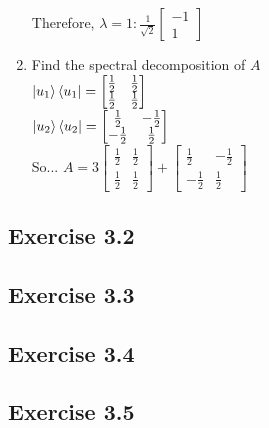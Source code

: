 \documentclass[12pt]{article}
\theoremstyle{plain}
\theoremstyle{nonumberplain}
\theoremstyle{plain}
\theoremstyle{nonumberplain}
\newcommand\1{{\bf 1}}
\newcommand{\bmat}[1]{\begin{bmatrix*} #1 \end{bmatrix*}} %
\newcommand{\<}{\left\langle}
\renewcommand{\>}{\right\rangle}
\begin{document}
\begin{enumerate}[label=(\alph*)]
\begin{center}
\end{center}
Therefore, $\lambda=1:\frac{1}{\sqrt{2}}\bmat{-1 \\ 1}$
\item Find the spectral decomposition of $A$ \\
$\ket{u_1}\bra{u_1}=\bmat{\frac{1}{2} & \frac{1}{2} \\ \frac{1}{2} & \frac{1}{2}}$ \\
$\ket{u_2}\bra{u_2}=\bmat{\frac{1}{2} & -\frac{1}{2} \\ -\frac{1}{2} & \frac{1}{2}}$ \\
So...
$A=3\bmat{\frac{1}{2} & \frac{1}{2} \\ \frac{1}{2} & \frac{1}{2}}+\bmat{\frac{1}{2} & -\frac{1}{2} \\ -\frac{1}{2} & \frac{1}{2}}$
\end{enumerate}


\subsection{Exercise 3.2}


\subsection{Exercise 3.3}


\subsection{Exercise 3.4}


\subsection{Exercise 3.5}

\end{document}
